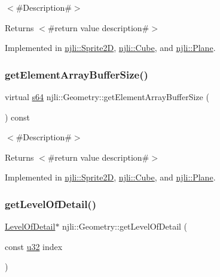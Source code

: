 $<$\#\+Description\#$>$

\begin{DoxyReturn}{Returns}
$<$\#return value description\#$>$ 
\end{DoxyReturn}


Implemented in \mbox{\hyperlink{classnjli_1_1_sprite2_d_a87994e01a64d5c6c72c98434f7147a08}{njli\+::\+Sprite2D}}, \mbox{\hyperlink{classnjli_1_1_cube_a23d0d7188f82ae0b16d79a809b4656ea}{njli\+::\+Cube}}, and \mbox{\hyperlink{classnjli_1_1_plane_a13ae025d91ca2ef639d1ba4e92b5ccc5}{njli\+::\+Plane}}.

\mbox{\label{classnjli_1_1_geometry_ac857e830af897450652aee0922e62e20}} 
\subsubsection{\texorpdfstring{get\+Element\+Array\+Buffer\+Size()}{getElementArrayBufferSize()}}
{\footnotesize\ttfamily virtual \mbox{\hyperlink{_util_8h_a4258bfb2c3a440d06c4aaa3c2b450dde}{s64}} njli\+::\+Geometry\+::get\+Element\+Array\+Buffer\+Size (\begin{DoxyParamCaption}{ }\end{DoxyParamCaption}) const\hspace{0.3cm}{\ttfamily [pure virtual]}}

$<$\#\+Description\#$>$

\begin{DoxyReturn}{Returns}
$<$\#return value description\#$>$ 
\end{DoxyReturn}


Implemented in \mbox{\hyperlink{classnjli_1_1_sprite2_d_a214b06be63b407db77a24bd639b39b60}{njli\+::\+Sprite2D}}, \mbox{\hyperlink{classnjli_1_1_cube_abf93b9573c3ef1b94809e50774a06379}{njli\+::\+Cube}}, and \mbox{\hyperlink{classnjli_1_1_plane_a5826539217d13c19c72ed6504d1b6d15}{njli\+::\+Plane}}.

\mbox{\label{classnjli_1_1_geometry_aec96c72c2a2a25ff38d2ab5fc0f29ebe}} 
\subsubsection{\texorpdfstring{get\+Level\+Of\+Detail()}{getLevelOfDetail()}\hspace{0.1cm}{\footnotesize\ttfamily [1/2]}}
{\footnotesize\ttfamily \mbox{\hyperlink{classnjli_1_1_level_of_detail}{Level\+Of\+Detail}}$\ast$ njli\+::\+Geometry\+::get\+Level\+Of\+Detail (\begin{DoxyParamCaption}\item[{const \mbox{\hyperlink{_util_8h_a10e94b422ef0c20dcdec20d31a1f5049}{u32}}}]{index }\end{DoxyParamCaption})}

